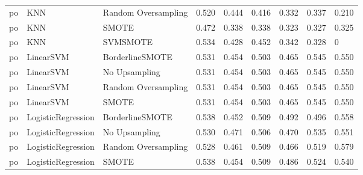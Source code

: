 \begin{tabular}{lllllllll}
      po &                          KNN & Random Oversampling & 0.520 &                     0.444 &                 0.416 &                  0.332 &                                   0.337 &     0.210 \\
      po &                          KNN &               SMOTE & 0.472 &                     0.338 &                 0.338 &                  0.323 &                                   0.327 &     0.325 \\
      po &                          KNN &            SVMSMOTE & 0.534 &                     0.428 &                 0.452 &                  0.342 &                                   0.328 &         0 \\
      po &                    LinearSVM &     BorderlineSMOTE & 0.531 &                     0.454 &                 0.503 &                  0.465 &                                   0.545 &     0.550 \\
      po &                    LinearSVM &       No Upsampling & 0.531 &                     0.454 &                 0.503 &                  0.465 &                                   0.545 &     0.550 \\
      po &                    LinearSVM & Random Oversampling & 0.531 &                     0.454 &                 0.503 &                  0.465 &                                   0.545 &     0.550 \\
      po &                    LinearSVM &               SMOTE & 0.531 &                     0.454 &                 0.503 &                  0.465 &                                   0.545 &     0.550 \\
      po &           LogisticRegression &     BorderlineSMOTE & 0.538 &                     0.452 &                 0.509 &                  0.492 &                                   0.496 &     0.558 \\
      po &           LogisticRegression &       No Upsampling & 0.530 &                     0.471 &                 0.506 &                  0.470 &                                   0.535 &     0.551 \\
      po &           LogisticRegression & Random Oversampling & 0.528 &                     0.461 &                 0.509 &                  0.466 &                                   0.519 &     0.579 \\
      po &           LogisticRegression &               SMOTE & 0.538 &                     0.454 &                 0.509 &                  0.486 &                                   0.524 &     0.540 \\

\end{tabular}
